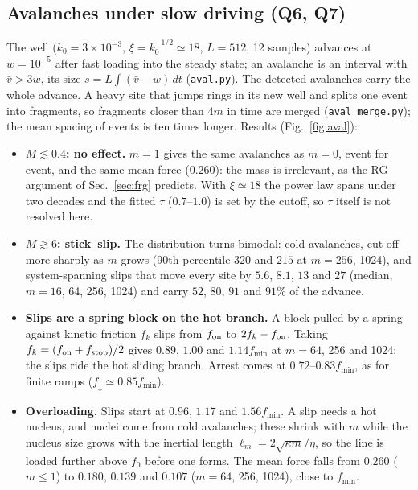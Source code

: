 \documentclass[10pt,a4paper]{article}
\newcommand{\fd}{f_\downarrow}
\begin{document}
\subsection{Avalanches under slow driving (Q6, Q7)}
\label{sec:aval}
The well ($k_0=3\times10^{-3}$, $\xi=k_0^{-1/2}\simeq18$, $L=512$, 12 samples) advances at $\dot w=10^{-5}$ after fast loading into the steady state; an avalanche is an interval with $\bar v>3\dot w$, its size $s=L\int(\bar v-\dot w)\,dt$ (\texttt{aval.py}). The detected avalanches carry the whole advance. A heavy site that jumps rings in its new well and splits one event into fragments, so fragments closer than $4m$ in time are merged (\texttt{aval\_merge.py}); the mean spacing of events is ten times longer. Results (Fig.~\ref{fig:aval}):
\begin{itemize}
\item \textbf{$M\lesssim0.4$: no effect.} $m=1$ gives the same avalanches as $m=0$, event for event, and the same mean force ($0.260$): the mass is irrelevant, as the RG argument of Sec.~\ref{sec:frg} predicts. With $\xi\simeq18$ the power law spans under two decades and the fitted $\tau$ ($0.7$--$1.0$) is set by the cutoff, so $\tau$ itself is not resolved here.
\item \textbf{$M\gtrsim6$: stick--slip.} The distribution turns bimodal: cold avalanches, cut off more sharply as $m$ grows (90th percentile $320$ and $215$ at $m=256$, 1024), and system-spanning slips that move every site by $5.6$, $8.1$, $13$ and $27$ (median, $m=16$, 64, 256, 1024) and carry $52$, $80$, $91$ and $91\%$ of the advance.
\item \textbf{Slips are a spring block on the hot branch.} A block pulled by a spring against kinetic friction $f_k$ slips from $f_{\rm on}$ to $2f_k-f_{\rm on}$. Taking $f_k=(f_{\rm on}+f_{\rm stop})/2$ gives $0.89$, $1.00$ and $1.14f_{\min}$ at $m=64$, 256 and 1024: the slips ride the hot sliding branch. Arrest comes at $0.72$--$0.83f_{\min}$, as for finite ramps ($\fd\simeq0.85f_{\min}$).
\item \textbf{Overloading.} Slips start at $0.96$, $1.17$ and $1.56f_{\min}$. A slip needs a hot nucleus, and nuclei come from cold avalanches; these shrink with $m$ while the nucleus size grows with the inertial length $\ell_m=2\sqrt{\kappa m}/\eta$, so the line is loaded further above $f_0$ before one forms. The mean force falls from $0.260$ ($m\le1$) to $0.180$, $0.139$ and $0.107$ ($m=64$, 256, 1024), close to $f_{\min}$.
\end{itemize}
\end{document}
